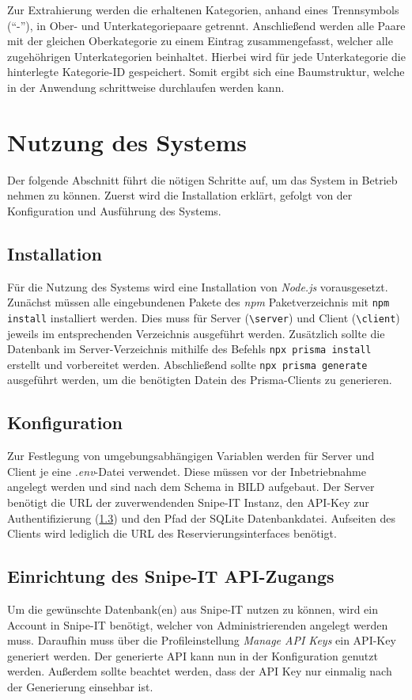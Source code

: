 Zur Extrahierung werden die erhaltenen Kategorien, anhand eines Trennsymbols (\enquote{-}), in Ober- und
Unterkategoriepaare getrennt. Anschließend werden alle Paare mit der gleichen Oberkategorie zu einem
Eintrag zusammengefasst, welcher alle zugehöhrigen Unterkategorien beinhaltet. Hierbei wird für jede
Unterkategorie die hinterlegte Kategorie-ID gespeichert. Somit ergibt sich eine Baumstruktur, welche
in der Anwendung schrittweise durchlaufen werden kann. 


\section{Nutzung des Systems}
Der folgende Abschnitt führt die nötigen Schritte auf, um das System in Betrieb nehmen zu können.
Zuerst wird die Installation erklärt, gefolgt von der Konfiguration und Ausführung des Systems.

\subsection{Installation}
Für die Nutzung des Systems wird eine Installation von \textit{Node.js} vorausgesetzt. Zunächst
müssen alle eingebundenen Pakete des \textit{npm} Paketverzeichnis mit \lstinline{npm install}
installiert werden. Dies muss für Server (\lstinline{\server}) und Client (\lstinline{\client})
jeweils im entsprechenden Verzeichnis ausgeführt werden. Zusätzlich sollte die Datenbank im
Server-Verzeichnis mithilfe des Befehls \lstinline{npx prisma install }
erstellt und vorbereitet werden. Abschließend sollte \lstinline{npx prisma generate} ausgeführt
werden, um die benötigten Datein des Prisma-Clients zu generieren. 

\subsection{Konfiguration}
Zur Festlegung von umgebungsabhängigen Variablen werden für Server und Client je eine
\textit{.env}-Datei verwendet. Diese müssen vor der Inbetriebnahme angelegt werden und sind nach dem
Schema in BILD aufgebaut. Der Server benötigt die URL der zuverwendenden Snipe-IT Instanz, den
API-Key zur Authentifizierung (\ref{section:api}) und den Pfad der SQLite Datenbankdatei.
Aufseiten des Clients wird lediglich die URL des Reservierungsinterfaces benötigt.


\subsection{Einrichtung des Snipe-IT API-Zugangs}
\label{section:api}
Um die gewünschte Datenbank(en) aus Snipe-IT nutzen zu können, wird ein Account in Snipe-IT
benötigt, welcher von Administrierenden angelegt werden muss. Daraufhin muss über die
Profileinstellung \textit{Manage API Keys} ein API-Key generiert werden. Der generierte API kann nun
in der Konfiguration genutzt werden. Außerdem sollte beachtet werden, dass der API Key nur einmalig
nach der Generierung einsehbar ist.

